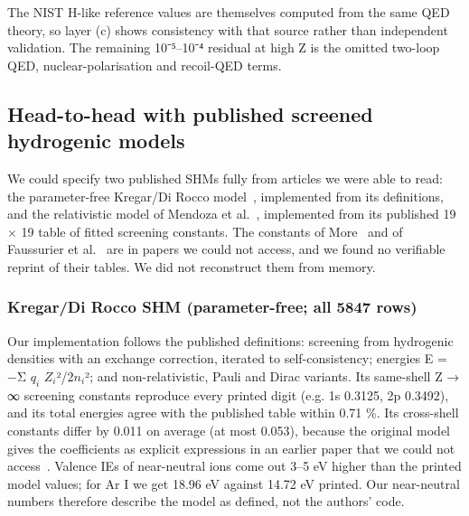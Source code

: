 \documentclass[aps,pra,preprint,notitlepage,superscriptaddress,amsmath,amssymb]{revtex4-2}
\begin{document}
The NIST H-like reference values are themselves computed from the same QED theory, so layer (c) shows consistency with that source rather than independent validation. The remaining 10⁻⁵–10⁻⁴ residual at high Z is the omitted two-loop QED, nuclear-polarisation and recoil-QED terms.


\subsection{Head-to-head with published screened hydrogenic models}

We could specify two published SHMs fully from articles we were able to read: the parameter-free Kregar/Di Rocco model~\cite{r19,r21}, implemented from its definitions, and the relativistic model of Mendoza et al.~\cite{r16}, implemented from its published 19 × 19 table of fitted screening constants. The constants of More~\cite{r11} and of Faussurier et al.~\cite{r12} are in papers we could not access, and we found no verifiable reprint of their tables. We did not reconstruct them from memory.


\subsubsection{Kregar/Di Rocco SHM (parameter-free; all 5847 rows)}

Our implementation follows the published definitions: screening from hydrogenic densities with an exchange correction, iterated to self-consistency; energies E = −Σ $q_{i}$ $Z_{i}$²/2$n_{i}$²; and non-relativistic, Pauli and Dirac variants. Its same-shell Z → ∞ screening constants reproduce every printed digit (e.g. 1s 0.3125, 2p 0.3492), and its total energies agree with the published table within 0.71 \%. Its cross-shell constants differ by 0.011 on average (at most 0.053), because the original model gives the coefficients as explicit expressions in an earlier paper that we could not access~\cite{r19}. Valence IEs of near-neutral ions come out 3–5 eV higher than the printed model values; for Ar I we get 18.96 eV against 14.72 eV printed. Our near-neutral numbers therefore describe the model as defined, not the authors' code.
\end{document}
